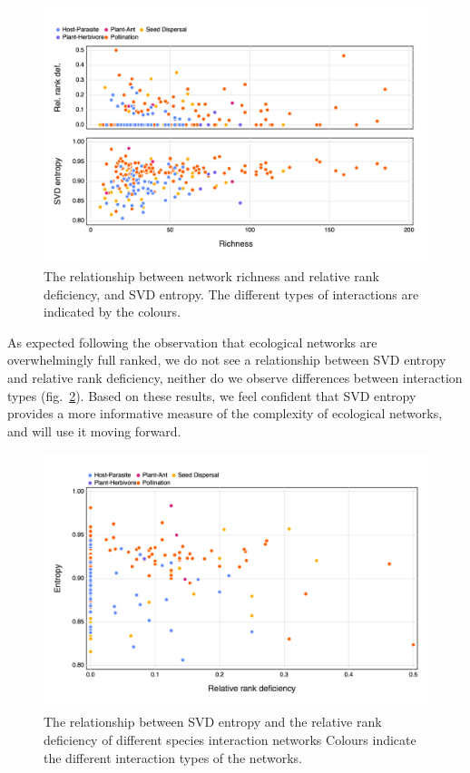\documentclass[10pt,oneside]{article}
\makeatletter
\def\maxwidth{\ifdim\Gin@nat@width>\linewidth\linewidth
\else\Gin@nat@width\fi}
\let\Oldincludegraphics\includegraphics
\renewcommand{\includegraphics}[1]{\Oldincludegraphics[width=\maxwidth]{#1}}
\makeatother
\begin{document}
\begin{figure}
\hypertarget{fig:size}{%
\centering
\includegraphics{figures/size_v_rankentropy.png}
\caption{The relationship between network richness and relative rank
deficiency, and SVD entropy. The different types of interactions are
indicated by the colours.}\label{fig:size}
}
\end{figure}

As expected following the observation that ecological networks are
overwhelmingly full ranked, we do not see a relationship between SVD
entropy and relative rank deficiency, neither do we observe differences
between interaction types (fig.~\ref{fig:entropy_v_rank}). Based on
these results, we feel confident that SVD entropy provides a more
informative measure of the complexity of ecological networks, and will
use it moving forward.

\begin{figure}
\hypertarget{fig:entropy_v_rank}{%
\centering
\includegraphics{figures/entropy_v_rank.png}
\caption{The relationship between SVD entropy and the relative rank
deficiency of different species interaction networks Colours indicate
the different interaction types of the
networks.}\label{fig:entropy_v_rank}
}
\end{figure}
\end{document}
